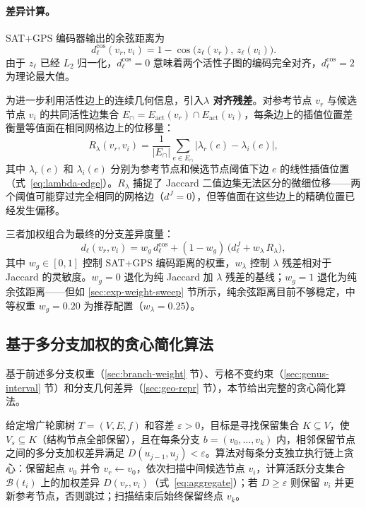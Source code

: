 \documentclass[twocolumn, a4paper, 10pt]{article}
\begin{document}
\paragraph{差异计算。}SAT+GPS 编码器输出的余弦距离为
\begin{equation}
d^{\mathrm{cos}}_\ell(v_r,v_i)=1-\cos\bigl(z_\ell(v_r),\,z_\ell(v_i)\bigr).
\label{eq:gnndist}
\end{equation}
由于 $z_\ell$ 已经 $L_2$ 归一化，$d^{\mathrm{cos}}_\ell{=}0$ 意味着两个活性子图的编码完全对齐，$d^{\mathrm{cos}}_\ell{=}2$ 为理论最大值。

为进一步利用活性边上的连续几何信息，引入\textbf{$\lambda$ 对齐残差}。对参考节点 $v_r$ 与候选节点 $v_i$ 的共同活性边集合 $E_{\cap}=E_{\mathrm{act}}(v_r)\cap E_{\mathrm{act}}(v_i)$，每条边上的插值位置差衡量等值面在相同网格边上的位移量：
\begin{equation}
R_\lambda(v_r,v_i) = \frac{1}{|E_\cap|}\sum_{e\in E_\cap}\bigl|\lambda_r(e)-\lambda_i(e)\bigr|,
\label{eq:lambda-residual}
\end{equation}
其中 $\lambda_r(e)$ 和 $\lambda_i(e)$ 分别为参考节点和候选节点阈值下边 $e$ 的线性插值位置（式~\eqref{eq:lambda-edge}）。$R_\lambda$ 捕捉了 Jaccard 二值边集无法区分的微细位移——两个阈值可能穿过完全相同的网格边（$d^J{=}0$），但等值面在这些边上的精确位置已经发生偏移。

三者加权组合为最终的分支差异度量：
\begin{equation}
d_\ell(v_r,v_i)=w_g\,d^{\mathrm{cos}}_\ell + (1{-}w_g)\,\bigl(d^J_\ell + w_\lambda\,R_\lambda\bigr),
\label{eq:pair-dist}
\end{equation}
其中 $w_g\in[0,1]$ 控制 SAT+GPS 编码距离的权重，$w_\lambda$ 控制 $\lambda$ 残差相对于 Jaccard 的灵敏度。$w_g{=}0$ 退化为纯 Jaccard 加 $\lambda$ 残差的基线；$w_g{=}1$ 退化为纯余弦距离——但如 \ref{sec:exp-weight-sweep} 节所示，纯余弦距离目前不够稳定，中等权重 $w_g{=}0.20$ 为推荐配置（$w_\lambda{=}0.25$）。

\subsection{基于多分支加权的贪心简化算法}
\label{sec:greedy}

基于前述多分支权重（\ref{sec:branch-weight} 节）、亏格不变约束（\ref{sec:genus-interval} 节）和分支几何差异（\ref{sec:geo-repr} 节），本节给出完整的贪心简化算法。

给定增广轮廓树 $T=(V,E,f)$ 和容差 $\varepsilon>0$，目标是寻找保留集合 $K\subseteq V$，使 $V_s\subseteq K$（结构节点全部保留），且在每条分支 $b=(v_0,\ldots,v_k)$ 内，相邻保留节点之间的多分支加权差异满足 $D(u_{j-1},u_j)<\varepsilon$。算法对每条分支独立执行链上贪心：保留起点 $v_0$ 并令 $v_r\leftarrow v_0$，依次扫描中间候选节点 $v_i$，计算活跃分支集合 $\mathcal{B}(t_i)$ 上的加权差异 $D(v_r,v_i)$（式~\eqref{eq:aggregate}）；若 $D\geq\varepsilon$ 则保留 $v_i$ 并更新参考节点，否则跳过；扫描结束后始终保留终点 $v_k$。
\end{document}
